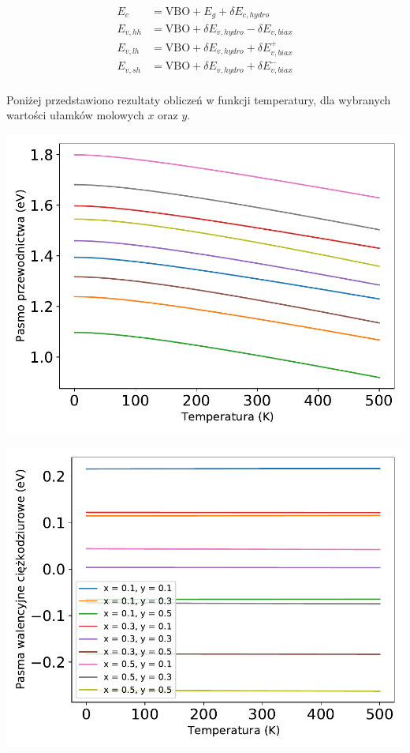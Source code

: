 \documentclass[12pt,openany,a4paper]{book}
\begin{document}
\begin{align*}
	E_c &= \textrm{VBO} + E_g + \delta E_{c,hydro}\\
	E_{v,hh} &= \textrm{VBO} + \delta E_{v,hydro} - \delta E_{v,biax}\\
	E_{v,lh} &= \textrm{VBO} + \delta E_{v,hydro} + \delta E_{v,biax}^{+}\\
	E_{v,sh} &= \textrm{VBO} + \delta E_{v,hydro} + \delta E_{v,biax}^{-}\\
\end{align*}

Poniżej przedstawiono rezultaty obliczeń w funkcji temperatury, dla wybranych wartości ułamków molowych \(x\) oraz \(y\).

\begin{minipage}[t]{0.5\textwidth}
	\includegraphics[width = \linewidth]{Figures/strain/Ec1.pdf}\label{fig:Ec1}
\end{minipage}
\begin{minipage}[t]{0.5\textwidth}
	\includegraphics[width = \linewidth]{Figures/strain/Ev_hh1.pdf}\label{fig:Ev_hh1}
\end{minipage}
\end{document}
